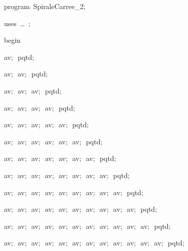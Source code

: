 
{
\parindent {}
\medskip

\carrenoir
\vspace{\neglskip}\mbox{\blc  \idt  \mcl program\idt \ SpiraleCarree\_2$;$
}\par 
\vspace{\neglskip}\mbox{\blc \blk\idt \mcl uses\idt \ \ldots\ $;$
}\par 
\vspace{\neglskip}\mbox{\blc  \idt  \mcl begin\idt }\par 
\vspace{\neglskip}\mbox{\blc  \blk\idt  av$;$\ pqtd$;$}\par 
\vspace{\neglskip}\mbox{\blc  \blk\idt  av$;$\ av$;$\ pqtd$;$}\par 
\vspace{\neglskip}\mbox{\blc  \blk\idt  av$;$\ av$;$\ av$;$\ pqtd$;$}\par 
\vspace{\neglskip}\mbox{\blc  \blk\idt  av$;$\ av$;$\ av$;$\ av$;$\ pqtd$;$}\par 
\vspace{\neglskip}\mbox{\blc  \blk\idt  av$;$\ av$;$\ av$;$\ av$;$\ av$;$\ pqtd$;$}\par 
\vspace{\neglskip}\mbox{\blc  \blk\idt  av$;$\ av$;$\ av$;$\ av$;$\ av$;$\ av$;$\ pqtd$;$}\par 
\vspace{\neglskip}\mbox{\blc  \blk\idt  av$;$\ av$;$\ av$;$\ av$;$\ av$;$\ av$;$\ av$;$\ pqtd$;$}\par 
\vspace{\neglskip}\mbox{\blc  \blk\idt  av$;$\ av$;$\ av$;$\ av$;$\ av$;$\ av$;$\ av$;$\ av$;$\ pqtd$;$}\par 
\vspace{\neglskip}\mbox{\blc  \blk\idt  av$;$\ av$;$\ av$;$\ av$;$\ av$;$\ av$;$\ av$;$\ av$;$\ av$;$\ pqtd$;$}\par 
\vspace{\neglskip}\mbox{\blc  \blk\idt  av$;$\ av$;$\ av$;$\ av$;$\ av$;$\ av$;$\ av$;$\ av$;$\ av$;$\ av$;$\ pqtd$;$}\par 
\vspace{\neglskip}\mbox{\blc  \blk\idt  av$;$\ av$;$\ av$;$\ av$;$\ av$;$\ av$;$\ av$;$\ av$;$\ av$;$\ av$;$\ av$;$\ pqtd$;$}\par 
\vspace{\neglskip}\mbox{\blc  \blk\idt  av$;$\ av$;$\ av$;$\ av$;$\ av$;$\ av$;$\ av$;$\ av$;$\ av$;$\ av$;$\ av$;$\ av$;$\ pqtd$;$}\par 
}
